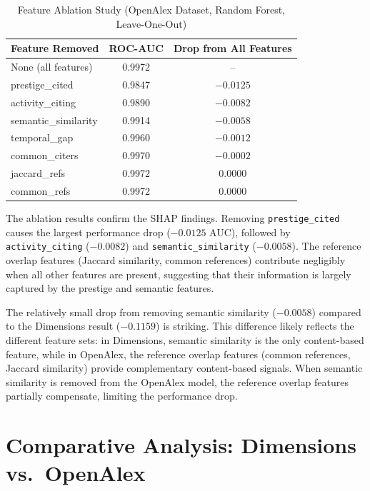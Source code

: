 \documentclass[12pt,a4paper]{article}
\begin{document}
\begin{table}[h!]
\centering
\caption{Feature Ablation Study (OpenAlex Dataset, Random Forest, Leave-One-Out)}
\label{tab:oa_ablation}
\begin{tabular}{lcc}
\toprule
\textbf{Feature Removed} & \textbf{ROC-AUC} & \textbf{Drop from All Features} \\
\midrule
None (all features) & 0.9972 & -- \\
prestige\_cited & 0.9847 & $-0.0125$ \\
activity\_citing & 0.9890 & $-0.0082$ \\
semantic\_similarity & 0.9914 & $-0.0058$ \\
temporal\_gap & 0.9960 & $-0.0012$ \\
common\_citers & 0.9970 & $-0.0002$ \\
jaccard\_refs & 0.9972 & $0.0000$ \\
common\_refs & 0.9972 & $0.0000$ \\
\bottomrule
\end{tabular}
\end{table}

The ablation results confirm the SHAP findings. Removing \texttt{prestige\_cited} causes the largest performance drop ($-0.0125$ AUC), followed by \texttt{activity\_citing} ($-0.0082$) and \texttt{semantic\_similarity} ($-0.0058$). The reference overlap features (Jaccard similarity, common references) contribute negligibly when all other features are present, suggesting that their information is largely captured by the prestige and semantic features.

The relatively small drop from removing semantic similarity ($-0.0058$) compared to the Dimensions result ($-0.1159$) is striking. This difference likely reflects the different feature sets: in Dimensions, semantic similarity is the only content-based feature, while in OpenAlex, the reference overlap features (common references, Jaccard similarity) provide complementary content-based signals. When semantic similarity is removed from the OpenAlex model, the reference overlap features partially compensate, limiting the performance drop.

\section{Comparative Analysis: Dimensions vs.\ OpenAlex}
\label{sec:comp}
\end{document}
